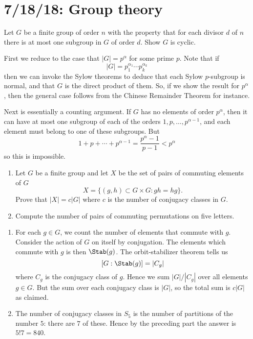 \section{7/18/18: Group theory}
\begin{problem}
	Let $G$ be a finite group of order $n$ with the property that for each divisor $d$ of $n$ there is at most one subgroup in $G$ of order $d$. Show $G$ is cyclic.
\end{problem}
\begin{solution}
	First we reduce to the case that $|G|= p^\alpha$ for some prime $p$. Note that if
	\[
		|G| = p_1^{\alpha_1} \cdots p_k^{\alpha_k}
	\]
	then we can invoke the Sylow theorems to deduce that each Sylow $p$-subgroup is normal, and that $G$ is the direct product of them. So, if we show the result for $p^\alpha$, then the general case follows from the Chinese Remainder Theorem for instance.
	
	Next is essentially a counting argument. If $G$ has no elements of order $p^\alpha$, then it can have at most one subgroup of each of the orders $1, p, \ldots, p^{\alpha-1}$, and each element must belong to one of these subgroups. But
	\[
		1 + p + \cdots + p^{\alpha-1} = \frac{p^\alpha - 1}{p - 1} < p^\alpha
	\]
	so this is impossible.
\end{solution}

\begin{problem}\hfill
	\begin{enumerate}
		\item Let $G$ be a finite group and let $X$ be the set of pairs of commuting elements of $G$
		\[
			X = \{(g,h)\subset G\times G : gh=hg\}.
		\]
		Prove that $|X| = c|G|$ where $c$ is the number of conjugacy classes in $G$.
		\item Compute the number of pairs of commuting permutations on five letters.
	\end{enumerate}
\end{problem}
\begin{solution}\hfill
	\begin{enumerate}
		\item For each $g \in G$, we count the number of elements that commute with $g$. Consider the action of $G$ on itself by conjugation. The elements which commute with $g$ is then $\Stab(g)$. The orbit-stabilizer theorem tells us
		\[
			[G: \Stab(g)] = |C_g|
		\]
		where $C_g$ is the conjugacy class of $g$. Hence we sum $|G|/|C_g|$ over all elements $g\in G$. But the sum over each conjugacy class is $|G|$, so the total sum is $c|G|$ as claimed.
		\item The number of conjugacy classes in $S_5$ is the number of partitions of the number $5$: there are $7$ of these.
		Hence by the preceding part the answer is $5!7 = 840$.
	\end{enumerate}
\end{solution}

